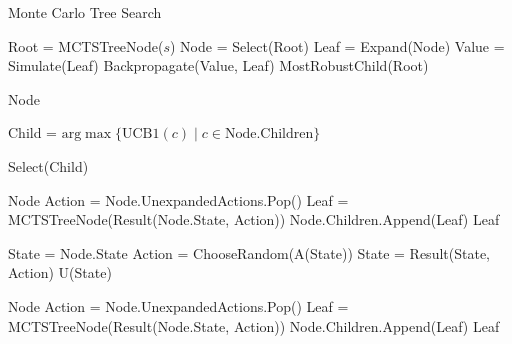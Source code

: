 
\begin{algorithm}[H]
    \caption{Monte Carlo Tree Search}
    \label{alg:mcts}
    \begin{algorithmic}[1]
    
        \State Root = MCTSTreeNode($s$)
            \State Node = Select(Root)
            \State Leaf = Expand(Node)
            \State Value = Simulate(Leaf)
            \State Backpropagate(Value, Leaf)
        \EndWhile
        \State \Return MostRobustChild(Root)
    \EndProcedure
    \end{algorithmic}

    \begin{algorithmic}[1]

            \State \Return Node
        \EndIf
        
        \State Child = 
        $\text{arg}\max \{ \text{UCB1}(c) \;|\; c \in \text{Node.Children} \}$ 

        \State \Return Select(Child)
    \EndProcedure
    
    \end{algorithmic}
        
    \begin{algorithmic}[1]

            \State \Return Node
        \EndIf
        \State Action = Node.UnexpandedActions.Pop()
        \State Leaf = MCTSTreeNode(Result(Node.State, Action))
        \State Node.Children.Append(Leaf)
        \State \Return Leaf
    \EndProcedure
    \end{algorithmic}

    \begin{algorithmic}[1]
        \State State = Node.State
            \State Action = ChooseRandom(A(State))
            \State State = Result(State, Action)
        \EndWhile
        \State \Return U(State)
    \EndProcedure
    \end{algorithmic}

    \begin{algorithmic}[1]

            \State \Return Node
        \EndIf
        \State Action = Node.UnexpandedActions.Pop()
        \State Leaf = MCTSTreeNode(Result(Node.State, Action))
        \State Node.Children.Append(Leaf)
        \State \Return Leaf
    \EndProcedure
    \end{algorithmic}
\end{algorithm}

